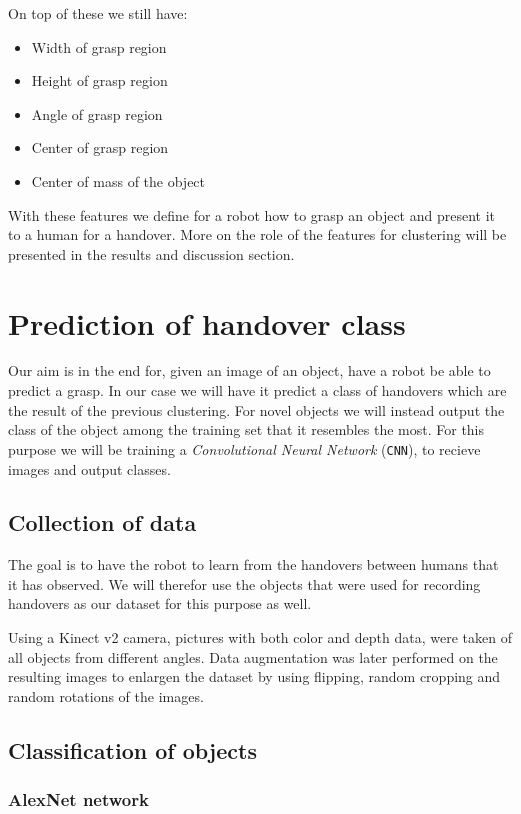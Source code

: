 On top of these we still have:
\begin{itemize}
	\item Width of grasp region
	\item Height of grasp region
	\item Angle of grasp region
	\item Center of grasp region
	\item Center of mass of the object
\end{itemize}

With these features we define for a robot how to grasp an object and present it to a human for a handover. More on the role of the features for clustering will be presented in the results and discussion section.


\section{Prediction of handover class}

Our aim is in the end for, given an image of an object, have a robot be able to predict a grasp. In our case we will have it predict a class of handovers which are the result of the previous clustering. For novel objects we will instead output the class of the object among the training set that it resembles the most. For this purpose we will be training a \emph{Convolutional Neural Network} (\texttt{CNN}), to recieve images and output classes.

\subsection{Collection of data}

The goal is to have the robot to learn from the handovers between humans that it has observed. We will therefor use the objects that were used for recording handovers as our dataset for this purpose as well.

Using a Kinect v2 camera, pictures with both color and depth data, were taken of all objects from different angles. Data augmentation was later performed on the resulting images to enlargen the dataset by using flipping, random cropping and random rotations of the images.

\subsection{Classification of objects}

\subsubsection{AlexNet network}

